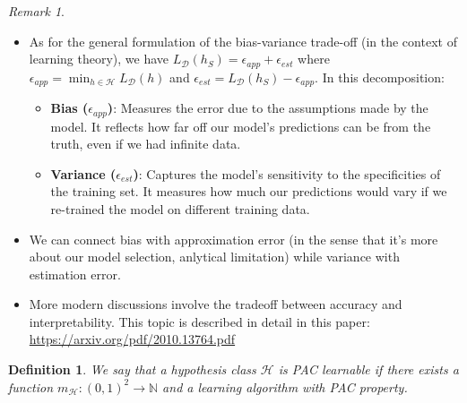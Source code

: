 \documentclass[11pt,reqno]{amsart}
\newtheorem{definition}{Definition}
\theoremstyle{remark}
\newtheorem{remark}[example]{Remark}
\begin{document}
\begin{remark}
\begin{itemize}
\begin{proof}
Trick is to reverse engineer, and the remainder term will cancel. 
\begin{align*}
E_{X\sim \mathcal{D}}\left((Y-\hat f(x_0))^2|x=x_0\right) 
&= E_{X\sim \mathcal{D}}\left((Y-f(x_0)+f(x_0)-\hat f(x_0))^2|X=x_0\right) \\
&= E_{X\sim \mathcal{D}}\left((Y-f(x_0))^2+(f(x_0)-\hat f(x_0))^2|X=x_0\right) \\
&= E_{X\sim \mathcal{D}}\left((Y-f(x_0))^2+(f(x_0)-E(\hat f(x_0)))^2+(E(\hat f(x_0))-\hat f(x_0))^2|X=x_0\right) \\
&= \sigma^2 + \text{Bias}(f_k(x))^2 + \text{Var}(f_k(x))
\end{align*}
\end{proof}
\item As for the general formulation of the bias-variance trade-off (in the context of learning theory), we have $L_\mathcal{D}(h_S)=\epsilon_{app}+\epsilon_{est}$ where $\epsilon_{app}=\min_{h\in\mathcal{H}}L_\mathcal{D}(h)$ and $\epsilon_{est}=L_\mathcal{D}(h_S)-\epsilon_{app}$. In this decomposition:
\begin{itemize}
\item \textbf{Bias ($\epsilon_{app}$)}: Measures the error due to the assumptions made by the model. It reflects how far off our model's predictions can be from the truth, even if we had infinite data.
\item \textbf{Variance ($\epsilon_{est}$)}: Captures the model's sensitivity to the specificities of the training set. It measures how much our predictions would vary if we re-trained the model on different training data.
\end{itemize}
\item We can connect bias with approximation error (in the sense that 
it's more about our model selection, anlytical limitation) while variance with estimation error.
\item More modern discussions involve the tradeoff between accuracy and interpretability. This topic is described in detail in this paper: \url{https://arxiv.org/pdf/2010.13764.pdf}
\end{itemize}
\end{remark}

\begin{definition}
We say that a hypothesis class $\mathcal{H}$ is PAC learnable if there exists
 a function $m_{\mathcal{H}}:(0,1)^2\to\mathbb{N}$ and a learning algorithm
  with PAC property.
\end{definition}
\end{document}
